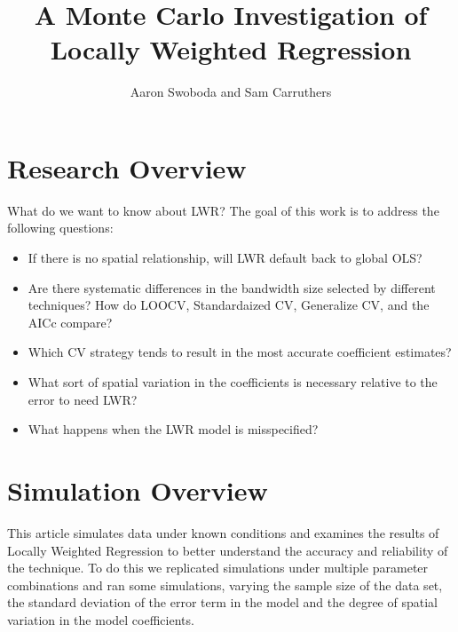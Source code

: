 \documentclass{article}\usepackage{graphicx, color}
\title{A Monte Carlo Investigation of Locally Weighted Regression}
\author{Aaron Swoboda and Sam Carruthers}
\begin{document}
\maketitle

\citet{Anderson2006d}

\citet{Koschinsky2011}




\section{Research Overview}

What do we want to know about LWR? The goal of this work is to address the following questions:
\begin{itemize}
  \item If there is no spatial relationship, will LWR default back to global OLS?
  \item Are there systematic differences in the bandwidth size selected by different techniques? How do LOOCV, Standardaized CV, Generalize CV, and the AICc compare?
  \item Which CV strategy tends to result in the most accurate coefficient estimates?
  \item What sort of spatial variation in the coefficients is necessary relative to the error to need LWR?
  \item What happens when the LWR model is misspecified?
\end{itemize}

\section{Simulation Overview}


This article simulates data under known conditions and examines the results of Locally Weighted Regression to better understand the accuracy and reliability of the technique. To do this we replicated simulations under multiple parameter combinations and ran some simulations, varying the sample size of the data set, the standard deviation of the error term in the model and the degree of spatial variation in the model coefficients. 
\end{document}
